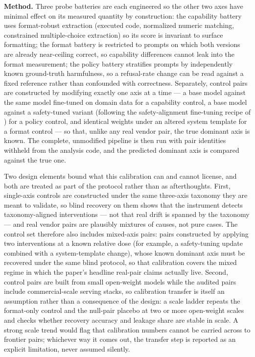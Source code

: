 \documentclass[11pt]{article}
\begin{document}
\textbf{Method.} Three probe batteries are each engineered so the other two axes have minimal effect on its measured quantity by construction: the capability battery uses format-robust extraction (executed code, normalized numeric matching, constrained multiple-choice extraction) so its score is invariant to surface formatting; the format battery is restricted to prompts on which both versions are already near-ceiling correct, so capability differences cannot leak into the format measurement; the policy battery stratifies prompts by independently known ground-truth harmfulness, so a refusal-rate change can be read against a fixed reference rather than confounded with correctness. Separately, control pairs are constructed by modifying exactly one axis at a time --- a base model against the same model fine-tuned on domain data for a capability control, a base model against a safety-tuned variant (following the safety-alignment fine-tuning recipe of \citealp{ContrastiveOverRefusalGXcN}) for a policy control, and identical weights under an altered system template for a format control --- so that, unlike any real vendor pair, the true dominant axis is known. The complete, unmodified pipeline is then run with pair identities withheld from the analysis code, and the predicted dominant axis is compared against the true one.

Two design elements bound what this calibration can and cannot license, and both are treated as part of the protocol rather than as afterthoughts. First, single-axis controls are constructed under the same three-axis taxonomy they are meant to validate, so blind recovery on them shows that the instrument detects taxonomy-aligned interventions --- not that real drift is spanned by the taxonomy --- and real vendor pairs are plausibly mixtures of causes, not pure cases. The control set therefore also includes mixed-axis pairs: pairs constructed by applying two interventions at a known relative dose (for example, a safety-tuning update combined with a system-template change), whose known dominant axis must be recovered under the same blind protocol, so that calibration covers the mixed regime in which the paper's headline real-pair claims actually live. Second, control pairs are built from small open-weight models while the audited pairs include commercial-scale serving stacks, so calibration transfer is itself an assumption rather than a consequence of the design: a scale ladder repeats the format-only control and the null-pair placebo at two or more open-weight scales and checks whether recovery accuracy and leakage share are stable in scale. A strong scale trend would flag that calibration numbers cannot be carried across to frontier pairs; whichever way it comes out, the transfer step is reported as an explicit limitation, never assumed silently.
\end{document}
